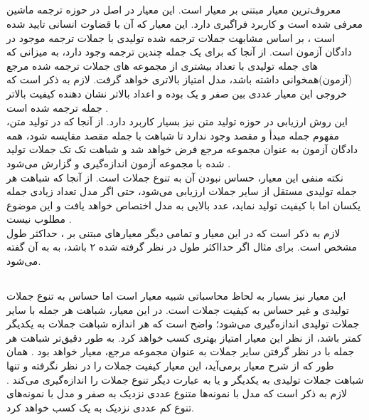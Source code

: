 \subsection{\bleu{}}
معروف‌ترین معیار مبتنی بر \ngramphrase{} معیار \bleu{} است. این معیار در اصل در حوزه ترجمه ماشین معرفی شده است و کاربرد فراگیری دارد. این معیار که
آن با قضاوت انسانی تایید شده است \cite{bleu}، بر اساس مشابهت \ngramphrase{} جملات ترجمه شده تولیدی با جملات ترجمه موجود در دادگان آزمون است. از آنجا که برای یک جمله چندین ترجمه وجود دارد، به میزانی که \ngramphrase{}‌های جمله تولیدی با تعداد بیشتری از مجموعه \ngram{}‌های جملات ترجمه شده مرجع (آزمون)‌همخوانی داشته باشد، مدل امتیاز بالا‌تری خواهد گرفت. لازم به ذکر است که خروجی این معیار عددی بین صفر و یک بوده و اعداد بالاتر نشان دهنده کیفیت بالاتر جمله ترجمه شده است \cite{bleu}.
\\
این روش ارزیابی در حوزه تولید متن نیز بسیار کاربرد دارد. از آنجا که در تولید متن، مفهوم جمله مبدأ و مقصد وجود ندارد تا شباهت با جمله مقصد مقایسه شود، همه دادگان آزمون به عنوان مجموعه مرجع فرض خواهد شد و شباهت تک تک جملات تولید شده با مجموعه آزمون اندازه‌گیری و گزارش می‌شود \cite{seqgan}.
\\
نکته منفی این معیار، حساس نبودن آن به تنوع جملات است. از آنجا که شباهت هر جمله تولیدی مستقل از سایر جملات ارزیابی می‌شود، حتی اگر مدل تعداد زیادی جمله یکسان اما با کیفیت تولید نماید، عدد بالایی به مدل اختصاص خواهد یافت و این موضوع مطلوب نیست \cite{jointly}.
\\
لازم به ذکر است که در این معیار و تمامی دیگر معیارهای مبتنی بر \ngramphrase{}، حداکثر طول \ngramphrase{} مشخص است. برای مثال اگر حدااکثر طول \ngramphrase{} در نظر گرفته شده ۲ باشد، به به آن \bleu[-2]{} گفته می‌شود.
\subsection{\selfbleu{}}
این معیار نیز بسیار به لحاظ محاسباتی شبیه معیار \bleu{} است اما حساس به تنوع جملات تولیدی و غیر حساس به کیفیت جملات است. در این معیار، شباهت هر جمله با سایر جملات تولیدی اندازه‌گیری می‌شود؛ واضح است که هر اندازه شباهت جملات به یکدیگر کمتر باشد، از نظر این معیار امتیاز بهتری کسب خواهد کرد. به طور دقیق‌تر شباهت \bleu{} هر جمله با در نظر گرفتن سایر جملات به عنوان مجموعه مرجع، معیار \selfbleu{} خواهد بود \cite{seqgan}. همان طور که از شرح معیار بر‌می‌آید، این معیار کیفیت جملات را در نظر نگرفته و تنها شباهت جملات تولیدی به یکدیگر و یا به عبارت دیگر تنوع جملات را اندازه‌گیری می‌کند \cite{jointly}. لازم به ذکر است که مدل با نمونه‌ها متنوع عددی نزدیک به صفر و مدل با نمونه‌های تنوع کم عددی نزدیک به یک کسب خواهد کرد.
